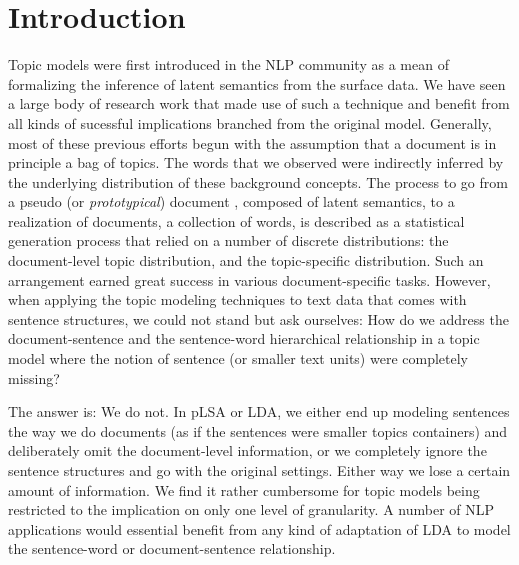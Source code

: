 \begin{abstract}

\end{abstract}

\section{Introduction} \label{s:introduction}
Topic models were first introduced in the NLP community as a mean of
formalizing the inference of latent semantics from the surface data.  We have
seen a large body of research work that made use of such a technique and
benefit from all kinds of sucessful implications branched from the original
model.  Generally, most of these previous efforts begun with the assumption
that a document is in principle a bag of topics.  The words that we observed
were indirectly inferred by the underlying distribution of these background
concepts.  The process to go from a pseudo (or {\it prototypical}) document ,
composed of latent semantics, to a realization of documents, a collection of
words, is described as a statistical generation process that relied on a number
of discrete distributions: the document-level topic distribution, and the
topic-specific distribution.  Such an arrangement earned great success in
various document-specific tasks.  However, when applying the topic modeling
techniques to text data that comes with sentence structures, we could not stand
but ask ourselves: How do we address the document-sentence and the
sentence-word hierarchical relationship in a topic model where the notion of
sentence (or smaller text units) were completely missing?  

The answer is: We do not.  In pLSA or LDA, we either end up modeling sentences
the way we do documents (as if the sentences were smaller topics containers)
and deliberately omit the document-level information, or we completely ignore
the sentence structures and go with the original settings.  Either way we lose
a certain amount of information.  We find it rather cumbersome for topic models
being restricted to the implication on only one level of granularity.  A number
of NLP applications would essential benefit from any kind of adaptation of LDA
to model the sentence-word or document-sentence relationship.

